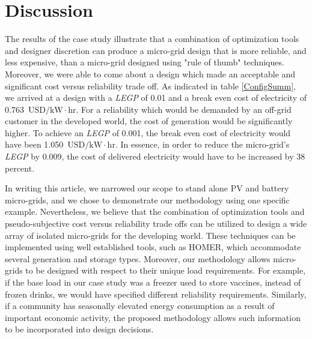 \documentclass[11p]{article}
\newcommand{\unit}[1]{\ensuremath{\, \mathrm{#1}}}
\begin{document}
\section{Discussion} \label{Discussion}

The results of the case study illustrate that a combination of optimization tools and designer discretion can produce a micro-grid design that is more reliable, and less expensive, than a micro-grid designed using "rule of thumb" techniques. 
Moreover, we were able to come about a design which made an acceptable and significant cost versus reliability trade off.
As indicated in table \ref{ConfigSumm}, we arrived at a design with a \emph{LEGP} of 0.01 and a break even cost of electricity of 0.763 \unit{USD/kW \! \cdot \! hr}.   
For a reliability which would be demanded by an off-grid customer in the developed world, the cost of generation would be significantly higher. 
To achieve an \emph{LEGP} of 0.001, the break even cost of electricity would have been 1.050 \unit{USD/kW \! \cdot \! hr}.
In essence, in order to reduce the micro-grid's \emph{LEGP} by 0.009, the cost of delivered electricity would have to be increased by 38 percent.   

In writing this article, we narrowed our scope to stand alone PV and battery micro-grids, and we chose to demonstrate our methodology using one specific example. 
Nevertheless, we believe that the combination of optimization tools and pseudo-subjective cost versus reliability trade offs can be utilized to design a wide array of isolated micro-grids for the developing world. 
These techniques can be implemented using well established tools, such as HOMER, which accommodate several generation and storage types.
Moreover, our methodology allows micro-grids to be designed with respect to their unique load requirements. 
For example, if the base load in our case study was a freezer used to store vaccines, instead of frozen drinks, we would have specified different reliability requirements. 
Similarly, if a community has seasonally elevated energy consumption as a result of important economic activity, the proposed methodology allows such information to be incorporated into design decisions.




\end{document}
